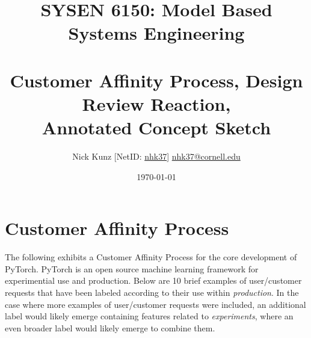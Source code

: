 \documentclass{article}
\begin{document}
\title{SYSEN 6150: Model Based Systems Engineering\\~\\
    \Large Customer Affinity Process, Design Review Reaction, \\
    Annotated Concept Sketch
}
\author{
    Nick Kunz [NetID: \url{nhk37}] \hyperlink{nhk37@cornell.edu}{nhk37@cornell.edu}}
\date{\today}
\maketitle
\thispagestyle{fancy}

\section*{Customer Affinity Process}
The following exhibits a Customer Affinity Process for the core development of PyTorch.
PyTorch is an open source machine learning framework for experimential use and production.
Below are 10 brief examples of user/customer requests that have been labeled according to their use within \textit{production}.
In the case where more examples of user/customer requests were included, an additional label would likely emerge containing features related to \textit{experiments}, where an even broader label would likely emerge to combine them.

\end{document}
